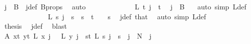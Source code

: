 \begin{isabellebody}
\ {\isacartoucheopen}j\ {\isasymnotin}\ B\ {}{\isacartoucheclose}\ j{\isacharunderscore}{\kern0pt}def\ B{\isacharunderscore}{\kern0pt}props\ \isamarkupfalse%
\ auto\isanewline
\isanewline
\ \ \ \ \ \ \ \ \ \ \isamarkupfalse%
\ \isamarkupfalse%
\ {\isachardoublequoteopen}L{\isacharprime}{\kern0pt}\ t\ j\ {\isacharequal}{\kern0pt}\ t{\isachardoublequoteclose}\ \isamarkupfalse%
\ {\isacartoucheopen}j\ {\isasymnotin}\ B\ {}{\isacartoucheclose}\ \isamarkupfalse%
\ {\isacharparenleft}{\kern0pt}auto\ simp{\isacharcolon}{\kern0pt}\ L{\isacharprime}{\kern0pt}{\isacharunderscore}{\kern0pt}def{\isacharparenright}{\kern0pt}\isanewline
\ \ \ \ \ \ \ \ \ \ \isamarkupfalse%
\ \isamarkupfalse%
\ {\isachardoublequoteopen}L{\isacharprime}{\kern0pt}\ s\ j\ {\isacharequal}{\kern0pt}\ s{\isachardoublequoteclose}\ \ {\isachardoublequoteopen}s\ {\isacharless}{\kern0pt}\ t\ {\isacharplus}{\kern0pt}\ {}{\isachardoublequoteclose}\ \ s\ \isamarkupfalse%
\ j{\isacharunderscore}{\kern0pt}def\ that\ \isamarkupfalse%
\ {\isacharparenleft}{\kern0pt}auto\ simp{\isacharcolon}{\kern0pt}\ L{\isacharprime}{\kern0pt}{\isacharunderscore}{\kern0pt}def{\isacharparenright}{\kern0pt}\isanewline
\ \ \ \ \ \ \ \ \ \ \isamarkupfalse%
\ \isamarkupfalse%
\ {\isacharquery}{\kern0pt}thesis\ \isamarkupfalse%
\ j{\isacharunderscore}{\kern0pt}def\ \isamarkupfalse%
\ blast\isanewline
\ \ \ \ \ \ \ \ \isamarkupfalse%
\isanewline
\ \ \ \ \ \ \isamarkupfalse%
\isanewline
\ \ \ \ \ \ \isamarkupfalse%
\ A{}{\isacharcolon}{\kern0pt}\ {\isachardoublequoteopen}{\isacharparenleft}{\kern0pt}{\isasymforall}x{\isacharless}{\kern0pt}t{\isacharplus}{\kern0pt}{}{\isachardot}{\kern0pt}\ {\isasymforall}y{\isacharless}{\kern0pt}t{\isacharplus}{\kern0pt}{}{\isachardot}{\kern0pt}\ L{\isacharprime}{\kern0pt}\ x\ j\ {\isacharequal}{\kern0pt}\ \ L{\isacharprime}{\kern0pt}\ y\ j{\isacharparenright}{\kern0pt}\ {\isasymor}\ {\isacharparenleft}{\kern0pt}{\isasymforall}s{\isacharless}{\kern0pt}t{\isacharplus}{\kern0pt}{}{\isachardot}{\kern0pt}\ L{\isacharprime}{\kern0pt}\ s\ j\ {\isacharequal}{\kern0pt}\ s{\isacharparenright}{\kern0pt}{\isachardoublequoteclose}\ \ {\isachardoublequoteopen}j\ {\isacharless}{\kern0pt}\ N{\isacharprime}{\kern0pt}{\isachardoublequoteclose}\ \ j\ \isanewline

\end{isabellebody}
